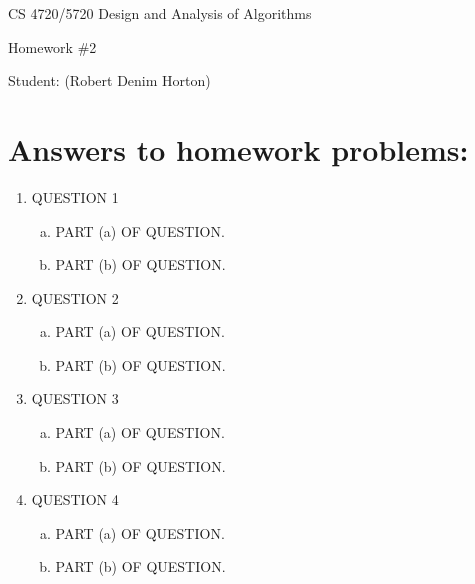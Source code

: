 \documentclass[11pt]{article}
\begin{document}
 

\rhead{\today}

\begin{center}\begin{Large}
CS 4720/5720 Design and Analysis of Algorithms

Homework \#2

Student: (Robert Denim Horton)
\end{Large}
\end{center}


\section*{Answers to homework problems:}

\begin{enumerate}
\item QUESTION 1
	\begin{enumerate}[(a)]
		\item PART (a) OF QUESTION.
		\item PART (b) OF QUESTION.
	\end{enumerate}
\item QUESTION 2
	\begin{enumerate}[(a)]
		\item PART (a) OF QUESTION.
		\item PART (b) OF QUESTION.
	\end{enumerate}
\item QUESTION 3
	\begin{enumerate}[(a)]
		\item PART (a) OF QUESTION.
		\item PART (b) OF QUESTION.
	\end{enumerate}
\item QUESTION 4
	\begin{enumerate}[(a)]
		\item PART (a) OF QUESTION.
		\item PART (b) OF QUESTION.
	\end{enumerate}
\end{enumerate}
\end{document}
